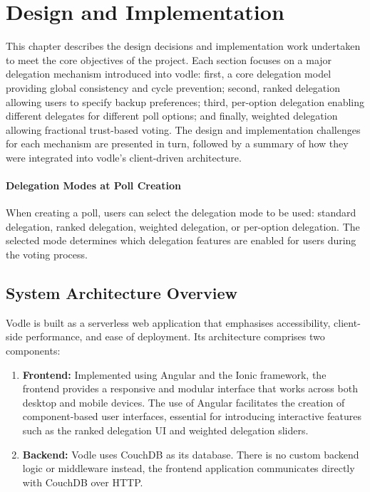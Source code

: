 \chapter{Design and Implementation}
\label{ch:design_implementation}
This chapter describes the design decisions and implementation work undertaken to meet the core objectives of the project. Each section focuses on a major delegation mechanism introduced into vodle: first, a core delegation model providing global consistency and cycle prevention; second, ranked delegation allowing users to specify backup preferences; third, per-option delegation enabling different delegates for different poll options; and finally, weighted delegation allowing fractional trust-based voting. The design and implementation challenges for each mechanism are presented in turn, followed by a summary of how they were integrated into vodle's client-driven architecture.

\subsubsection{Delegation Modes at Poll Creation}

When creating a poll, users can select the delegation mode to be used: standard delegation, ranked delegation, weighted delegation, or per-option delegation. The selected mode determines which delegation features are enabled for users during the voting process.

\section{System Architecture Overview}\label{sec:design_architecture}
Vodle is built as a serverless web application that emphasises accessibility, client-side performance, and ease of deployment. Its architecture comprises two components:

\begin{enumerate}
  \item \textbf{Frontend:} Implemented using Angular and the Ionic framework, the frontend provides a responsive and modular interface that works across both desktop and mobile devices. The use of Angular facilitates the creation of component-based user interfaces, essential for introducing interactive features such as the ranked delegation UI and weighted delegation sliders.
  \item \textbf{Backend:} Vodle uses CouchDB as its database. There is no custom backend logic or middleware
  instead, the frontend application communicates directly with CouchDB over HTTP.
\end{enumerate}

